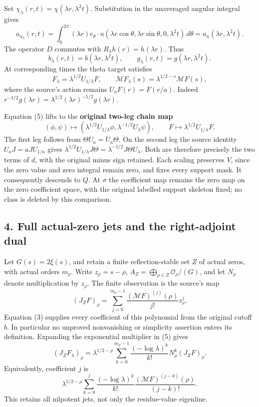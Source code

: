 Set \(\chi_\lambda(r,t)=\chi(\lambda r,\lambda^2t)\). Substitution in
the unaveraged angular integral gives \[
a_{u_\lambda}(r,t)=\int_0^{2\pi}(\lambda r)e_\theta\cdot u(\lambda r\cos\theta,\lambda r\sin\theta,0,\lambda^2t)\,d\theta
=a_u(\lambda r,\lambda^2t).
\] The operator \(D\) commutes with \(R_\lambda h(r)=h(\lambda r)\).
Thus \[
b_\lambda(r,t)=b(\lambda r,\lambda^2t),\qquad
g_\lambda(r,t)=g(\lambda r,\lambda^2t).
\tag{4}
\] At corresponding times the theta target satisfies \[
\boxed{F_\lambda=\lambda^{1/2}U_{1/\lambda}F,\qquad
\mathcal MF_\lambda(s)=\lambda^{1/2-s}\mathcal MF(s),}
\tag{5}
\] where the source's action remains \(U_aF(r)=F(r/a)\). Indeed
\(r^{-1/2}g(\lambda r)=\lambda^{1/2}(\lambda r)^{-1/2}g(\lambda r)\).

Equation (5) lifts to the \textbf{original two-leg chain map} \[
(\phi,\psi)\longmapsto
(\lambda^{1/2}U_{1/\lambda}\phi,\lambda^{-1/2}U_\lambda\psi),\qquad
F\longmapsto\lambda^{1/2}U_{1/\lambda}F.
\tag{6}
\] The first leg follows from \(\Theta U_a=U_a\Theta\). On the second
leg the source identity \(U_aJ=aJU_{1/a}\) gives
\(\lambda^{1/2}U_{1/\lambda}J\Theta=\lambda^{-1/2}J\Theta U_\lambda\).
Both are therefore precisely the two terms of \(d\), with the original
minus sign retained. Each scaling preserves \(V\), since the zero value
and zero integral remain zero, and fixes every support mask. It
consequently descends to \(Q\). At \(\sigma\) the coefficient map
remains the zero map on the zero coefficient space, with the original
labelled support skeleton fixed; no class is deleted by this comparison.

\subsection{4. Full actual-zero jets and the right-adjoint
dual}\label{proof09:full-actual-zero-jets-and-the-right-adjoint-dual}

Let \(G(s)=2\xi(s)\), and retain a finite reflection-stable set \(Z\) of
actual zeros, with actual orders \(m_\rho\). Write \(z_\rho=s-\rho\),
\(A_Z=\bigoplus_{\rho\in Z}\mathcal O_\rho/(G)\), and let \(N_\rho\)
denote multiplication by \(z_\rho\). The finite observation is the
source's map \[
(J_ZF)_\rho=\sum_{j=0}^{m_\rho-1}\frac{(\mathcal MF)^{(j)}(\rho)}{j!}z_\rho^j.
\] Equation (3) supplies every coefficient of this polynomial from the
original cutoff \(b\). In particular no unproved nonvanishing or
simplicity assertion enters its definition. Expanding the exponential
multiplier in (5) gives \[
\boxed{(J_ZF_\lambda)_\rho=\lambda^{1/2-\rho}
\sum_{k=0}^{m_\rho-1}\frac{(-\log\lambda)^k}{k!}N_\rho^k(J_ZF)_\rho.}
\tag{7}
\] Equivalently, coefficient \(j\) is \[
\lambda^{1/2-\rho}\sum_{k=0}^j
\frac{(-\log\lambda)^k}{k!}
\frac{(\mathcal MF)^{(j-k)}(\rho)}{(j-k)!}.
\] This retains all nilpotent jets, not only the residue-value
eigenline.

